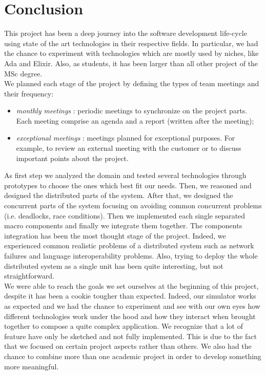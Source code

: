 \section{Conclusion}



This project has been a deep journey into the software development life-cycle
using state of the art technologies in their respective fields.
In particular, we had the chance to experiment
with technologies which are mostly used by
niches, like Ada and Elixir.
Also,  as students, it has been larger than all other project of the MSc
degree.
\\

We planned each stage of the project by defining the
types of team meetings and their frequency:
\begin{itemize}
	\item \textit{monthly meetings} : periodic meetings to synchronize on the
	project parts. Each meeting comprise an agenda and a report
	(written after the meeting);
	\item \textit{exceptional meetings} : meetings planned
	for exceptional purposes.
	For example, to review an external meeting with the customer
	or to discuss important points about the project.
\end{itemize}
As first step we analyzed the domain and tested several technologies through
prototypes to choose the ones which best fit our needs.
Then, we reasoned and designed the distributed parts of the system.
After that, we designed the concurrent parts of the system focusing
on avoiding common concurrent problems (i.e. deadlocks, race conditions).
Then we implemented each single separated macro components
and finally we integrate
them together. The components integration has been
the most thought stage of the project.
Indeed, we experienced common realistic problems of
a distributed system such as network failures and language interoperability
problems. Also, trying to deploy the whole distributed system as a single unit
has been quite interesting, but not straightforward.
\\

We were able to reach the goals we set ourselves at the beginning of this
project, despite it has been a cookie tougher than expected.
Indeed, our simulator works as expected and we had the chance to experiment
and see with our own eyes how different technologies work under the hood and
how they interact when brought
together to compose a quite complex application.
We recognize that a lot of feature have only be sketched and not fully
implemented. This is due to the fact that we focused on certain project aspects
rather than others.
We also had the chance to combine more than one academic project in order to
develop something more meaningful.


